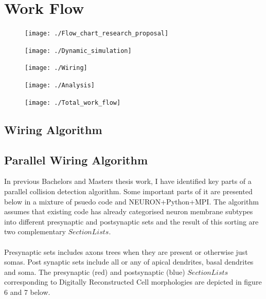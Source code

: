 \documentclass[a4paper,11pt]{article}
\begin{document}
\section{Work Flow}
\begin{figure}[H]
\centering
\texttt{[image: ./Flow\_chart\_research\_proposal]}
\caption{}
\label{fig:Flow_chart_research_proposal}
\end{figure}
\begin{figure}[H]
\centering
\texttt{[image: ./Dynamic\_simulation]}
\caption{}
\label{fig:Dynamic_simulation}
\end{figure}

\begin{figure}[H]
\centering
\texttt{[image: ./Wiring]}
\caption{}
\label{fig:Wiring}
\end{figure}
\begin{figure}[H]
\centering
\texttt{[image: ./Analysis]}
\caption{}
\label{fig:Analysis}
\end{figure}


\begin{figure}[H]
\centering
\texttt{[image: ./Total\_work\_flow]}
\caption{}
\label{fig:Analysis}
\end{figure}



\subsection{Wiring Algorithm}
\subsection{Parallel Wiring Algorithm}

In previous Bachelors and Masters thesis work, I have identified key parts of a parallel collision detection algorithm. Some important parts of it are presented below in a mixture of psuedo code and NEURON+Python+MPI. The algorithm assumes that existing code has already categorised neuron membrane subtypes into different presynaptic and postsynaptic sets and the result of this sorting are two complementary $SectionLists$. \\
\\
Presynaptic sets includes axons trees when they are present or otherwise just somas. Post synaptic sets include all or any of apical dendrites, basal dendrites and soma. The presynaptic (red) and postsynaptic (blue) $SectionLists$ corresponding to Digitally Reconstructed Cell morphologies are depicted  in figure 6 and 7 below.
\end{document}

